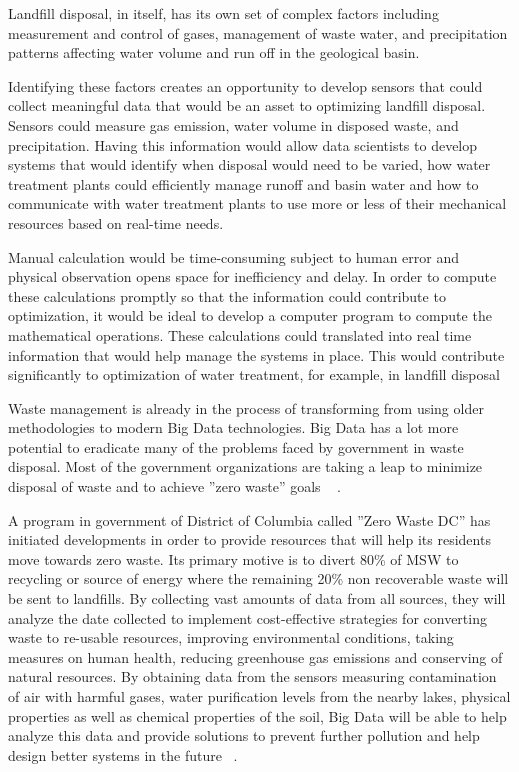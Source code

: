 \documentclass[sigconf]{acmart}
\begin{document}
Landfill disposal, in itself, has its own set of complex factors including measurement and control of gases, management of waste water, and precipitation patterns affecting water volume and run off  in the geological basin.  

Identifying these factors creates an opportunity to develop sensors that could collect meaningful data that would be an asset to optimizing landfill disposal.  Sensors could measure gas emission, water volume in disposed waste, and precipitation.  Having this information would allow data scientists to develop systems that would identify when disposal would need to be varied, how water treatment plants could efficiently manage runoff and basin water and how to communicate with water treatment plants to use more or less of their mechanical resources based on real-time needs. 

Manual calculation would be time-consuming subject to human error and physical observation opens space for inefficiency and delay.  In order to compute these calculations promptly so that the information could contribute to optimization, it would be ideal to develop a computer program to compute the mathematical operations.  These calculations could translated into real time information that would help manage the systems in place.  This would contribute significantly to optimization of water treatment, for example, in landfill disposal ~\cite{akbarpour2016}

Waste management is already in the process of transforming from using older methodologies to modern Big Data technologies. Big Data has a lot more potential to eradicate many of the problems faced by government in waste disposal. Most of the government organizations are taking a leap to minimize disposal of waste and to achieve ''zero waste'' goals ~\cite{rosengren2017} . 

A program in government of District of Columbia called ''Zero Waste DC'' has initiated developments in order to provide resources that will help its residents move towards zero waste. Its primary motive is to divert 80\% of MSW to recycling or source of energy where the remaining 20\% non recoverable waste will be sent to landfills. By collecting vast amounts of data from all sources, they will analyze  the date collected to implement cost-effective strategies for converting waste to re-usable resources, improving environmental conditions, taking measures on human health, reducing greenhouse gas emissions and conserving of natural resources. By obtaining data from the sensors measuring contamination of air with harmful gases, water purification levels from the nearby lakes, physical properties as well as chemical properties of the soil, Big Data will be able to help analyze this data and provide solutions to prevent further pollution and help design better systems in the future ~\cite{rosengren2017}.
\end{document}
